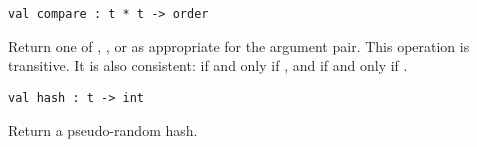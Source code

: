 \begin{cluster}
\label{grp:grm:key-interface::compare}

\begin{gram}[compare]
\label{grm:key-interface::compare}
\begin{verbatim}
val compare : t * t -> order
\end{verbatim}
Return one of , , or  as appropriate for
the argument pair. This operation is transitive. It is also consistent:
 if and only if , and
 if and only if .

\end{gram}
\end{cluster}

\begin{cluster}
\label{grp:grm:key-interface::hash}

\begin{gram}[hash]
\label{grm:key-interface::hash}
\begin{verbatim}
val hash : t -> int
\end{verbatim}
Return a pseudo-random hash.

\end{gram}
\end{cluster}

